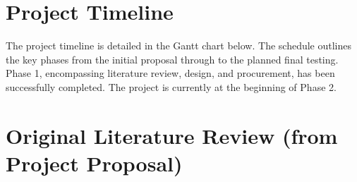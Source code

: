 \documentclass[11pt, a4paper]{article}
\begin{document}
\section{Project Timeline}
The project timeline is detailed in the Gantt chart below. The schedule outlines the key phases from the initial proposal through to the planned final testing. Phase 1, encompassing literature review, design, and procurement, has been successfully completed. The project is currently at the beginning of Phase 2.













\section{Original Literature Review (from Project Proposal)}
\label{app:full_lit_review}
\end{document}
